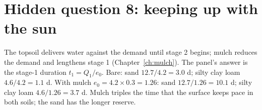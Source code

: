 \section{Hidden question 8: keeping up with the sun}
The topsoil delivers water against the demand until stage 2 begins; mulch reduces the demand and lengthens stage 1 (Chapter~\ref{ch:mulch}). The panel's answer is the stage-1 duration $t_1=Q_1/e_0$.
\sol  Bare: sand $12.7/4.2=3.0$ d; silty clay loam $4.6/4.2=1.1$ d. With mulch $e_0=4.2\times0.3=1.26$: sand $12.7/1.26=10.1$ d; silty clay loam $4.6/1.26=3.7$ d. Mulch triples the time that the surface keeps pace in both soils; the sand has the longer reserve.

